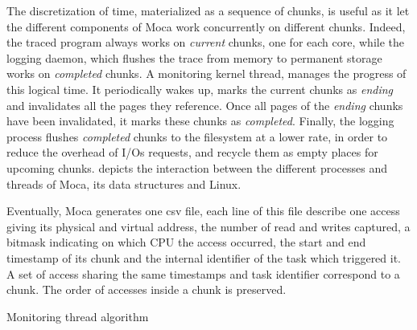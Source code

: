 The discretization of time, materialized as a sequence of chunks, is useful as it let the different components of \gls{Moca} work concurrently on different chunks.
Indeed, the traced program always works on \emph{current} chunks, one for each core, while the logging daemon, which flushes the trace from memory to permanent storage works on \emph{completed} chunks.
A monitoring kernel thread, manages the progress of this logical time.
It periodically wakes up, marks the current chunks as \emph{ending} and invalidates all the pages they reference.
Once all pages of the \emph{ending} chunks have been invalidated, it marks these chunks as \emph{completed}.
Finally, the logging process flushes \emph{completed} chunks to the filesystem at a lower rate, in order to reduce the overhead of I/Os requests, and recycle them as empty places for upcoming chunks.
  depicts the interaction between the different processes and threads of \gls{Moca}, its data structures and Linux.

Eventually, \gls{Moca} generates one csv file, each line of this file describe one access giving its physical and virtual address, the number of read and writes captured, a bitmask indicating on which CPU the access occurred, the start and end timestamp of its chunk and the internal identifier of the task which triggered it.
A set of access sharing the same timestamps and task identifier correspond to a chunk.
The order of accesses inside a chunk is preserved.

\begin{algorithm}[htb]
    \caption{Monitoring thread algorithm}
    \label{alg:monTh}
    \begin{algorithmic}[1]
                \State {}
                        \State {}
                        \State {}
                        \State {}
                    \EndFor
                \State {}
            \EndFor
            \State {}
        \EndWhile
    \end{algorithmic}
\end{algorithm}

